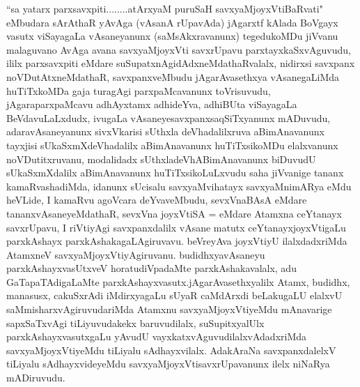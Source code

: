 \begin{artha}
``sa yatarx parxsavxpiti........atArxyaM puruSaH savxyaM\break joyxVtiBaRvati" eMbudara sArAthaR yAvAga (vAsanA rUpavAda) jAgarxtf kAlada BoVgayx vasutx viSayagaLa vAsaneyanunx (saMsAkxravanunx) tegedukoMDu jiVvanu malaguvano AvAga avana savxyaMjoyxVti savxrUpavu parxtayxkaSxvAguvudu, ililx parxsavxpiti eMdare suSupatxnAgidAdxneMdathaRvalalx, nidirxsi savxpanx noVDutAtxneMdathaR, savxpanxveMbudu jAgarAvasethxya vAsanegaLiMda huTiTxkoMDa gaja turagAgi parxpaMcavanunx toVrisuvudu, jAgaraparxpaMcavu adhAyxtamx adhideYva, adhiBUta viSayagaLa BeVdavuLaLxdudx, ivugaLa vAsaneye\break savxpanxsaqSiTxyanunx mADuvudu, adaravAsaneyanunx sivxVkarisi sUthxla deVhadalilxruva aBimAnavanunx tayxjisi sUkaSxmXdeVhadalilx aBimAnavanunx huTiTxsikoMDu elalxvanunx noVDutitxruvanu, modalidadx sUthxla\-\break deVhABimAnavanunx biDuvudU sUkaSxmXdalilx aBimAnavanunx huTiTxsikoLuLxvudu saha jiVvanige tananx kamaRvashadiMda, idanunx sUcisalu savxyaMvihatayx savxyaMnimARya eMdu heVLide, I kamaRvu agoVcara deYvaveMbudu, sevxVnaBAsA eMdare tananxvAsaneyeMdathaR, sevxVna joyxVtiSA = eMdare Atamxna ceYtanayx savxrUpavu, I riVtiyAgi savxpanxdalilx vAsane matutx ceYtanayxjoyxVtigaLu parxkAshayx parxkAshakagaLAgiruvavu. beVreyAva joyxVtiyU ilalxdadxriMda AtamxneV savxyaMjoyxVtiyAgiruvanu. budidhxyavAsaneyu parxkAshayxvasUtxveV horatu\break diVpadaMte parxkAshakavalalx, adu GaTapaTAdigaLaMte parxkAshayxvasutx.\break jAgarAvasethxyalilx Atamx, budidhx, manasusx, cakuSxrAdi iMdirxyagaLu sUyaR caMdArxdi beLakugaLU elalxvU saMmisharxvAgiruvudariMda Atamxnu savxyaMjoyxVtiyeMdu mAnavarige sapxSaTxvAgi tiLiyuvudakekx baruvudilalx, suSupitxyalUlx parxkAshayxvasutxgaLu yAvudU vayxkatxvAguvudilalxvAdadxriMda savxyaMjoyxVtiyeMdu tiLiyalu sAdhayxvilalx. AdakAraNa savxpanxdalelxV tiLiyalu sAdhayxvideyeMdu savxyaMjoyxVtisavxrUpavanunx ilelx niNaRya mADiruvudu.
\end{artha}%

